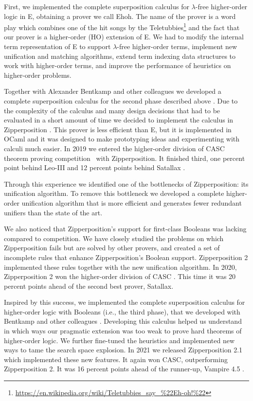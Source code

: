   
  First, we implemented the complete superposition calculus for $\lambda$-free
  higher-order logic \cite{bbcw-21-lfho} in E, obtaining a prover we call Ehoh.
  The name of the prover is a word play which combines one of the hit songs by the
  Teletubbies\footnote{\url{https://en.wikipedia.org/wiki/Teletubbies_say_\%22Eh-oh!\%22}}
  and the fact that our prover is a higher-order (HO) extension of E.
  We had to modify the internal term representation of E to support $\lambda$-free
  higher-order terms, implement new unification and matching algorithms, extend
  term indexing data structures to work with higher-order terms, and improve the
  performance of heuristics on higher-order problems.
  
  Together with Alexander Bentkamp and other colleagues we developed
  a complete superposition calculus for the second phase described above
  \cite{bbtvw-21-sup-lam}. Due to the complexity of the calculus and many design
  decisions that had to be evaluated in a short amount of time we decided to
  implement the calculus in Zipperposition \cite{sc-15-simon-phd,sc-supind-17}. This prover is less efficient than
  E, but it is implemented in OCaml and it was designed to make prototyping
  ideas and experimenting with calculi much easier. In 2019 we entered the
  higher-order division of CASC theorem proving competition~\cite{gs-19-casc27} with Zipperposition. 
  It finished third, one percent point behind Leo-III
  \cite{sb-21-leo3}  and 12 percent points behind  Satallax
  \cite{cb-12-satallax}.
  
  Through this experience we identified one of the bottlenecks of
  Zipperposition: its unification algorithm. To remove this bottleneck we
  developed a complete higher-order unification algorithm that is more
  efficient and generates fewer redundant unifiers than the state of the art. 
  
  We also noticed that Zipperposition's support for first-class Booleans
  was lacking compared to competition. We have closely studied the problems on
  which Zipperposition fails but are solved by other provers, and created
  a set of incomplete rules that enhance Zipperposition's Boolean support.
  Zipperposition 2 implemented these rules together with the new unification
  algorithm. In 2020, Zipperposition 2 won the higher-order division
  of CASC \cite{gs-21-cascj10}. This time it was 20 percent points ahead of the second best
  prover, Satallax.
  
  Inspired by this success, we implemented the complete superposition
  calculus for higher-order logic with Booleans (i.e., the third phase), that we developed with Bentkamp and other
  colleagues \cite{bbtv-21-full-ho-sup}. Developing this calculus helped us understand in which
  ways our pragmatic extension was too weak to prove hard theorems of
  higher-order logic. We further fine-tuned the heuristics and implemented new ways
  to tame the search space explosion. In 2021 we released Zipperposition 2.1
  which implemented these new features. It again won
  CASC, outperforming Zipperposition 2. It was 16 percent points ahead of the
  runner-up, Vampire 4.5 \cite{lkav-13-vampire}. 
  
